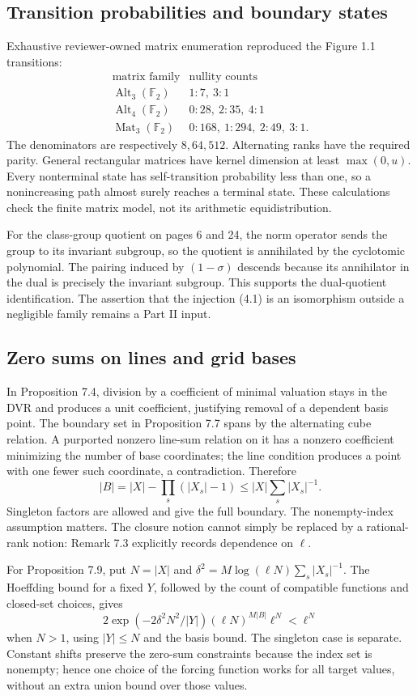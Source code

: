 \documentclass[10pt]{article}
\begin{document}
\subsection*{Transition probabilities and boundary states}
Exhaustive reviewer-owned matrix enumeration reproduced the Figure 1.1 transitions: \[\begin{array}{c|c}
\text{matrix family}&\text{nullity counts}\\ \hline
\operatorname{Alt}_3(\mathbb F_2)&1:7,\ 3:1\\
\operatorname{Alt}_4(\mathbb F_2)&0:28,\ 2:35,\ 4:1\\
\operatorname{Mat}_3(\mathbb F_2)&0:168,\ 1:294,\ 2:49,\ 3:1 .
\end{array}\] The denominators are respectively \(8,64,512\). Alternating ranks have the required parity. General rectangular matrices have kernel dimension at least \(\max(0,u)\). Every nonterminal state has self-transition probability less than one, so a nonincreasing path almost surely reaches a terminal state. These calculations check the finite matrix model, not its arithmetic equidistribution.\par
For the class-group quotient on pages 6 and 24, the norm operator sends the group to its invariant subgroup, so the quotient is annihilated by the cyclotomic polynomial. The pairing induced by \((1-\sigma)\) descends because its annihilator in the dual is precisely the invariant subgroup. This supports the dual-quotient identification. The assertion that the injection (4.1) is an isomorphism outside a negligible family remains a Part II input.\par
\subsection*{Zero sums on lines and grid bases}
In Proposition 7.4, division by a coefficient of minimal valuation stays in the DVR and produces a unit coefficient, justifying removal of a dependent basis point. The boundary set in Proposition 7.7 spans by the alternating cube relation. A purported nonzero line-sum relation on it has a nonzero coefficient minimizing the number of base coordinates; the line condition produces a point with one fewer such coordinate, a contradiction. Therefore \[|B|=|X|-\prod_s(|X_s|-1)\le |X|\sum_s|X_s|^{-1}.\] Singleton factors are allowed and give the full boundary. The nonempty-index assumption matters. The closure notion cannot simply be replaced by a rational-rank notion: Remark 7.3 explicitly records dependence on \(\ell\).\par
For Proposition 7.9, put \(N=|X|\) and \(\delta^2=M\log(\ell N)\sum_s|X_s|^{-1}\). The Hoeffding bound for a fixed \(Y\), followed by the count of compatible functions and closed-set choices, gives \[2\exp(-2\delta^2N^2/|Y|)(\ell N)^{M|B|}\ell^N<\ell^N\] when \(N>1\), using \(|Y|\le N\) and the basis bound. The singleton case is separate. Constant shifts preserve the zero-sum constraints because the index set is nonempty; hence one choice of the forcing function works for all target values, without an extra union bound over those values.\par
\end{document}
